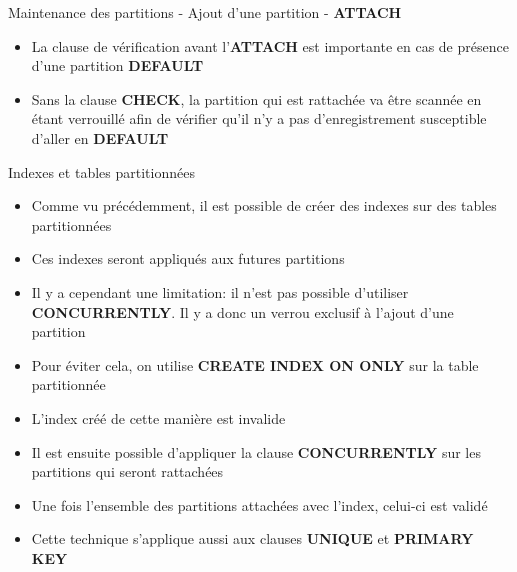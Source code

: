 \begin{frame}[fragile]{Maintenance des partitions - Ajout d'une partition - \textbf{ATTACH}}

   \begin{itemize}
      \item La clause de vérification avant l'\textbf{ATTACH} est importante en cas de présence d'une partition \textbf{DEFAULT}
      \item Sans la clause \textbf{CHECK}, la partition qui est rattachée va être scannée en étant verrouillé afin de vérifier qu'il n'y a pas d'enregistrement susceptible d'aller en \textbf{DEFAULT}
   \end{itemize}

\end{frame}


\begin{frame}[fragile]{Indexes et tables partitionnées}

   \begin{itemize}
      \item Comme vu précédemment, il est possible de créer des indexes sur des tables partitionnées
      \item Ces indexes seront appliqués aux futures partitions
      \item Il y a cependant une limitation: il n'est pas possible d'utiliser \textbf{CONCURRENTLY}. Il y a donc un verrou exclusif à l'ajout d'une partition
      \item Pour éviter cela, on utilise \textbf{CREATE INDEX ON ONLY} sur la table partitionnée
      \item L'index créé de cette manière est invalide
      \item Il est ensuite possible d'appliquer la clause \textbf{CONCURRENTLY} sur les partitions qui seront rattachées
      \item Une fois l'ensemble des partitions attachées avec l'index, celui-ci est validé
      \item Cette technique s'applique aussi aux clauses \textbf{UNIQUE} et \textbf{PRIMARY KEY}

   \end{itemize}

\end{frame}


